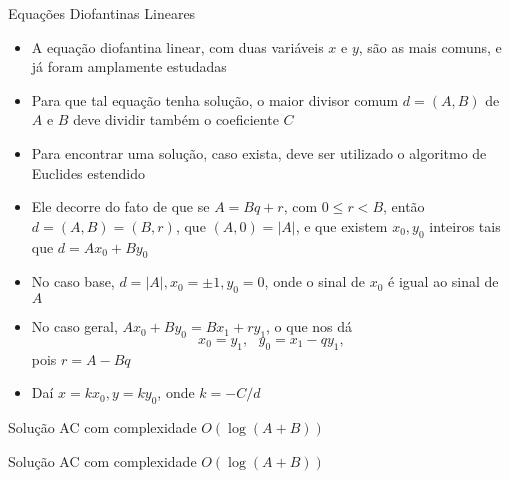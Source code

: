 \begin{frame}[fragile]{Equações Diofantinas Lineares}

    \begin{itemize}

        \item A equação diofantina linear, com duas variáveis $x$ e $y$, são as mais comuns,
            e já foram amplamente estudadas

        \item Para que tal equação tenha solução, o maior divisor comum $d = (A, B)$ de $A$ e $B$ 
            deve dividir também o coeficiente $C$

        \item Para encontrar uma solução, caso exista, deve ser utilizado o algoritmo de
            Euclides estendido

        \item Ele decorre do fato de que se $A = Bq + r$, com $0 \leq r < B$, então
            $d = (A, B) = (B, r)$, que $(A, 0) = |A|$, e que existem $x_0, y_0$ inteiros tais que
            $d = Ax_0 + By_0$ 

        \item No caso base, $d = |A|, x_0 = \pm 1, y_0 = 0$, onde o sinal de $x_0$ é igual ao
            sinal de $A$

        \item No caso geral, $Ax_0 + By_0 = Bx_1 + ry_1$, o que nos dá
        \[
            x_0 = y_1, \, \, \, \, y_0 = x_1 - qy_1,
        \]
        pois $r = A - Bq$

        \item Daí $x = kx_0, y = ky_0$, onde $k = -C/d$

    \end{itemize}

\end{frame}

\begin{frame}[fragile]{Solução AC com complexidade $O(\log (A + B))$}
\end{frame}

\begin{frame}[fragile]{Solução AC com complexidade $O(\log (A + B))$}
\end{frame}
